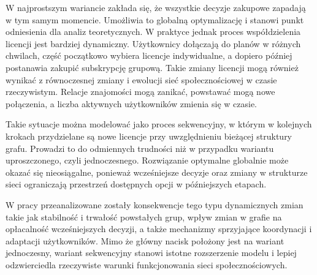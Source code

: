 W najprostszym wariancie zakłada się, że wszystkie decyzje zakupowe zapadają w tym samym momencie. Umożliwia to globalną optymalizację i stanowi punkt odniesienia dla analiz teoretycznych. W praktyce jednak proces współdzielenia licencji jest bardziej dynamiczny. Użytkownicy dołączają do planów w różnych chwilach, część początkowo wybiera licencje indywidualne, a dopiero później postanawia zakupić subskrypcję grupową. Takie zmiany licencji mogą również wynikać z równoczesnej zmiany i ewolucji sieć społecznościowej w czasie rzeczywistym. Relacje znajomości mogą zanikać, powstawać mogą nowe połączenia, a liczba aktywnych użytkowników zmienia się w czasie.

Takie sytuacje można modelować jako proces sekwencyjny, w którym w kolejnych krokach przydzielane są nowe licencje przy uwzględnieniu bieżącej struktury grafu. Prowadzi to do odmiennych trudności niż w przypadku wariantu uproszczonego, czyli jednoczesnego. Rozwiązanie optymalne globalnie może okazać się nieosiągalne, ponieważ wcześniejsze decyzje oraz zmiany w strukturze sieci ograniczają przestrzeń dostępnych opcji w późniejszych etapach.

W pracy przeanalizowane zostały konsekwencje tego typu dynamicznych zmian takie jak stabilność i trwałość powstałych grup, wpływ zmian w grafie na opłacalność wcześniejszych decyzji, a także mechanizmy sprzyjające koordynacji i adaptacji użytkowników. Mimo że główny nacisk położony jest na wariant jednoczesny, wariant sekwencyjny stanowi istotne rozszerzenie modelu i lepiej odzwierciedla rzeczywiste warunki funkcjonowania sieci społecznościowych.
